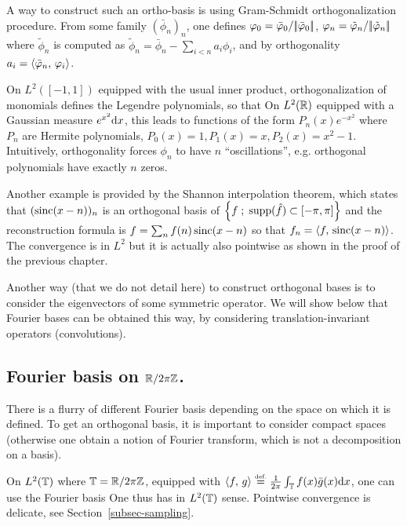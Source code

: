 A way to construct such an ortho-basis is using Gram-Schmidt orthogonalization procedure. From some family $(\bar\phi_n)_n$, one defines $\varphi_0=\bar{\varphi}_0/|\!| \bar{\varphi}_0 |\!|$, $\varphi_n=\tilde{\varphi}_n/|\!| \tilde{\varphi}_n |\!|$ where $\tilde\phi_n$ is computed as  $\tilde\phi_n=\bar\phi_n - \sum_{i<n} a_i \phi_i$, and by orthogonality $a_i = \langle \bar {\varphi}_n,\,\varphi_i\rangle$. 

On $L^2([-1,1])$ equipped with the usual inner product, orthogonalization of monomials defines the Legendre polynomials, so that
On $L^2(\mathbb{R})$ equipped with a Gaussian measure $e^{x^2}\mathrm{d} x$, this leads to functions of the form $P_n(x) e^{-x^2}$ where $P_n$ are Hermite polynomials, $P_0(x)=1, P_1(x)=x, P_2(x)=x^2-1$. Intuitively, orthogonality forces $\phi_n$ to have $n$ ``oscillations'', e.g. orthogonal polynomials have exactly $n$ zeros.

Another example is provided by the Shannon interpolation theorem, which states that $( \operatorname{sinc}(x-n) )_n$ is an orthogonal basis of $\left\{ f \;;\; \operatorname{supp}(\hat f) \subset [-\pi,\pi] \right\}$ and the reconstruction formula is $f=\sum_n f(n) \operatorname{sinc}(x-n)$ so that $f_n = \langle f,\,\operatorname{sinc}(x-n)\rangle$. The convergence is in $L^2$ but it is actually also pointwise as shown in the proof of the previous chapter. 


Another way (that we do not detail here) to construct orthogonal bases is to consider the eigenvectors of some symmetric operator. We will show below that Fourier bases can be obtained this way, by considering translation-invariant operators (convolutions). 


\subsection{Fourier basis on $\mathbb{R}/2\pi\mathbb{Z}$.}

There is a flurry of different Fourier basis depending on the space on which it is defined. To get an orthogonal basis, it is important to consider compact spaces (otherwise one obtain a notion of Fourier transform, which is not a decomposition on a basis). 

On $L^2(\mathbb{T})$ where $\mathbb{T}=\mathbb{R}/2\pi\mathbb{Z}$, equipped with $\langle f,\,g\rangle \stackrel{\mbox{\upshape\tiny def.}}{=} \frac{1}{2\pi}\int_{\mathbb{T}} f(x) \bar g(x) \mathrm{d} x$, one can use the Fourier basis 
One thus has
in $L^2(\mathbb{T})$ sense. Pointwise convergence is delicate, see Section~\ref{subsec-sampling}.

